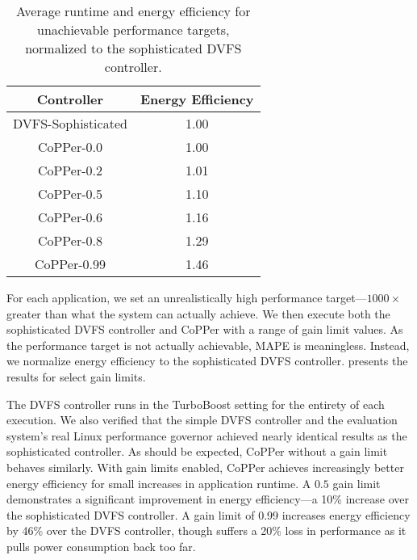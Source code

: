\begin{table}[t]
\small
\centering
\caption{Average runtime and energy efficiency for unachievable performance targets, normalized to the sophisticated DVFS controller.}
\begin{tabular}{cc}
  \textbf{Controller} & \textbf{Energy Efficiency} \\
  \hline
  \hline
  DVFS-Sophisticated &  1.00 \\
  CoPPer-0.0         &  1.00  \\
  CoPPer-0.2         &  1.01 \\
  CoPPer-0.5         &  1.10  \\
  CoPPer-0.6         &  1.16  \\
  CoPPer-0.8         &  1.29  \\
  CoPPer-0.99        &  1.46  \\
  \hline
  \hline
\end{tabular}
\label{tbl:copper-impossible}
\end{table}

For each application, we set an unrealistically high performance target---$1000\times$ greater than what the system can actually achieve.
We then execute both the sophisticated DVFS controller and CoPPer with a range of gain limit values.
As the performance target is not actually achievable, MAPE is meaningless.
Instead, we normalize energy efficiency to the sophisticated DVFS controller.
 presents the results for select gain limits.

The DVFS controller runs in the TurboBoost setting for the entirety of each execution.
We also verified that the simple DVFS controller and the evaluation system's real Linux performance governor achieved nearly identical results as the sophisticated controller.
As should be expected, CoPPer without a gain limit behaves similarly.
With gain limits enabled, CoPPer achieves increasingly better energy efficiency for small increases in application runtime.
A $0.5$ gain limit demonstrates a significant improvement in energy efficiency---a 10\% increase over the sophisticated DVFS controller.
A gain limit of 0.99 increases energy efficiency by 46\% over the DVFS controller, though suffers a 20\% loss in performance as it pulls power consumption back too far.

